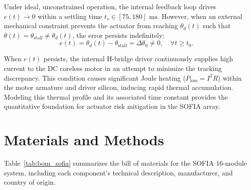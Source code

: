 \documentclass[lettersize,journal]{IEEEtran}
\begin{document}
Under ideal, unconstrained operation, the internal feedback loop drives $e(t) \to 0$ within a settling time $t_s \in [75, 180]\text{ ms}$. However, when an external mechanical constraint prevents the actuator from reaching $\theta_d(t)$ such that $\theta(t) = \theta_{\text{stall}} \neq \theta_d(t)$, the error persists indefinitely:
\begin{equation}
e(t) = \theta_d(t) - \theta_{\text{stall}} = \Delta\theta_0 \neq 0, \quad \forall t \ge t_0.
\label{eq:persistent_error}
\end{equation}

When $e(t)$ persists, the internal H-bridge driver continuously supplies high current to the DC coreless motor in an attempt to minimize the tracking discrepancy. This condition causes significant Joule heating ($P_{\text{loss}} = I^2 R$) within the motor armature and driver silicon, inducing rapid thermal accumulation. Modeling this thermal profile and its associated time constant provides the quantitative foundation for actuator risk mitigation in the SOFIA array.

\section{Materials and Methods}
\label{sec:methods}

Table~\ref{tab:bom_sofia} summarizes the bill of materials for the SOFIA 16-module system, including each component's technical description, manufacturer, and country of origin.
\end{document}
